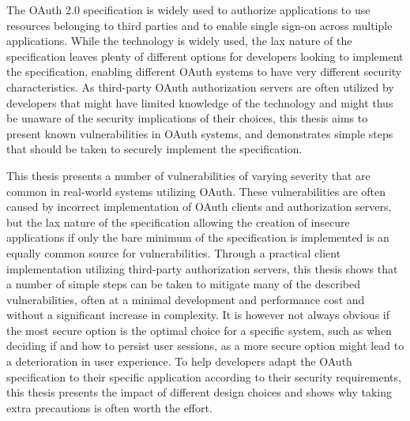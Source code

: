 \begin{abstractpage}[english]
The OAuth 2.0 specification is widely used to authorize applications to use resources belonging to third parties and to enable single sign-on across multiple applications.
While the technology is widely used, the lax nature of the specification leaves plenty of different options for developers looking to implement the specification, enabling different OAuth systems to have very different security characteristics.
As third-party OAuth authorization servers are often utilized by developers that might have limited knowledge of the technology and might thus be unaware of the security implications of their choices, this thesis aims to present known vulnerabilities in OAuth systems, and demonstrates simple steps that should be taken to securely implement the specification.

This thesis presents a number of vulnerabilities of varying severity that are common in real-world systems utilizing OAuth.
These vulnerabilities are often caused by incorrect implementation of OAuth clients and authorization servers, but the lax nature of the specification allowing the creation of insecure applications if only the bare minimum of the specification is implemented is an equally common source for vulnerabilities.
Through a practical client implementation utilizing third-party authorization servers, this thesis shows that a number of simple steps can be taken to mitigate many of the described vulnerabilities, often at a minimal development and performance cost and without a significant increase in complexity.
It is however not always obvious if the most secure option is the optimal choice for a specific system, such as when deciding if and how to persist user sessions, as a more secure option might lead to a deterioration in user experience.
To help developers adapt the OAuth specification to their specific application according to their security requirements, this thesis presents the impact of different design choices and shows why taking extra precautions is often worth the effort.
\end{abstractpage}